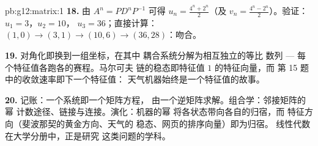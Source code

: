 \begin{solution}{pb:g12:matrix:1}
\textbf{18.} 由 $A^n = P D^n P^{-1}$ 可得
$u_n = \frac{4^n + 2^n}{2}$（及
$v_n = \frac{4^n - 2^n}{2}$）。验证：$u_1 = 3$，$u_2 = 10$，
$u_3 = 36$；直接计算：$(1,0) \to (3,1) \to (10,6) \to
(36, 28)$：吻合。

\textbf{19.} 对角化即换到一组坐标，在其中
耦合系统分解为相互独立的等比
数列 --- 每个特征值各跑各的赛程。马尔可夫
链的稳态即特征值 $1$ 的特征向量，而
第 15 题中的收敛速率即下一个特征值：
天气机器始终是一个特征值的故事。

\textbf{20.} 记账：一个系统即一个矩阵方程，
由一个逆矩阵求解。组合学：邻接矩阵的幂
计数途径、链接与连接。演化：机器的幂
将各状态带向各自的归宿，而
特征方向（斐波那契的黄金方向、天气的
稳态、网页的排序向量）即为归宿。
线性代数在大学分册中，正是研究
这类问题的学科。
\end{solution}

